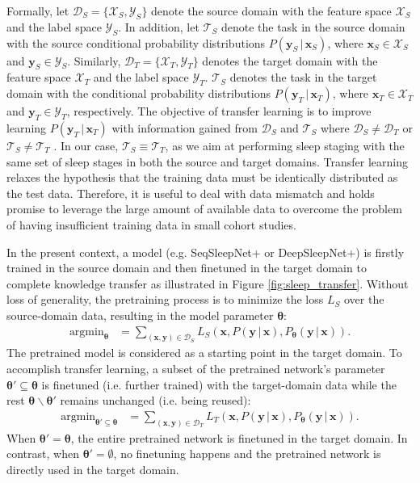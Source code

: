 \documentclass[journal,twoside,web]{ieeecolor}
\DeclareMathOperator*{\argmin}{argmin}
\begin{document}
Formally, let $\mathcal{D}_S=\{\mathcal{X}_S, \mathcal{Y}_S\}$ denote the source domain with the feature space $\mathcal{X}_S$ and the label space $\mathcal{Y}_S$. In addition, let $\mathcal{T}_S$ denote the task in the source domain with the source conditional probability distributions $P(\mathbf{y}_S\,|\,\mathbf{x}_S)$, where $\mathbf{x}_S \in \mathcal{X}_S$ and $\mathbf{y}_S \in \mathcal{Y}_S$. Similarly, $\mathcal{D}_T=\{\mathcal{X}_T, \mathcal{Y}_T\}$ denotes the target domain with the feature space $\mathcal{X}_T$ and the label space $\mathcal{Y}_T$. $\mathcal{T}_S$ denotes the task in the target domain with the conditional probability distributions $P(\mathbf{y}_T\,|\,\mathbf{x}_T)$, where $\mathbf{x}_T \in \mathcal{X}_T$ and $\mathbf{y}_T \in \mathcal{Y}_T$, respectively. The objective of transfer learning is to improve learning $P(\mathbf{y}_T\,|\,\mathbf{x}_T)$ with information gained from $\mathcal{D}_S$  and $\mathcal{T}_S$ where $\mathcal{D}_S \neq \mathcal{D}_T$ or  $\mathcal{T}_S \neq \mathcal{T}_T$ \cite{Pan2010}. In our case, $\mathcal{T}_S \equiv \mathcal{T}_T$, as we aim at performing sleep staging with the same set of sleep stages in both the source and target domains. Transfer learning \cite{Pan2010} relaxes the hypothesis that the training data must be  identically distributed as the test data. Therefore, it is useful to deal with data mismatch and holds promise to leverage the large amount of available data to overcome the problem of having insufficient training data in small cohort studies.

In the present context, a model (e.g. SeqSleepNet+ or DeepSleepNet+) is firstly trained in the source domain  and then finetuned in the target domain to complete knowledge transfer as illustrated in Figure \ref{fig:sleep_transfer}. Without loss of generality, the pretraining process is to minimize the loss $L_S$ over the source-domain data, resulting in the model parameter $\bm{\theta}$:
\begin{align}
\argmin_{\bm{\theta}} &= \sum_{(\mathbf{x},\mathbf{y}) \in \mathcal{D}_S}L_{S}\left(\mathbf{x}, P(\mathbf{y}\,|\,\mathbf{x}), P_{\bm{\theta}}\left(\mathbf{y}\,|\,\mathbf{x}\right)\right).
\label{eq:seq_rnn_output_pretrain}
\end{align}
The pretrained model is considered as a starting point in the target domain. To accomplish transfer learning, a subset of the pretrained network's parameter $\bm{\theta'} \subseteq \bm{\theta}$ is finetuned (i.e. further trained) with the target-domain data while the rest $\bm{\theta} \backslash \bm{\theta'}$ remains unchanged (i.e. being reused):
\begin{align}
\argmin_{\bm{\theta'} \subseteq \bm{\theta}} &= \sum_{(\mathbf{x},\mathbf{y}) \in \mathcal{D}_T}L_{T}\left(\mathbf{x}, P(\mathbf{y}\,|\,\mathbf{x}), P_{\bm{\theta}}\left(\mathbf{y}\,|\,\mathbf{x}\right)\right).
\label{eq:seq_rnn_output_finetune}
\end{align}
When $\bm{\theta'} = \bm{\theta}$, the entire pretrained network is finetuned in the target domain. In contrast, when $\bm{\theta'} = \emptyset$, no finetuning happens and the pretrained network is directly used in the target domain.
\end{document}
